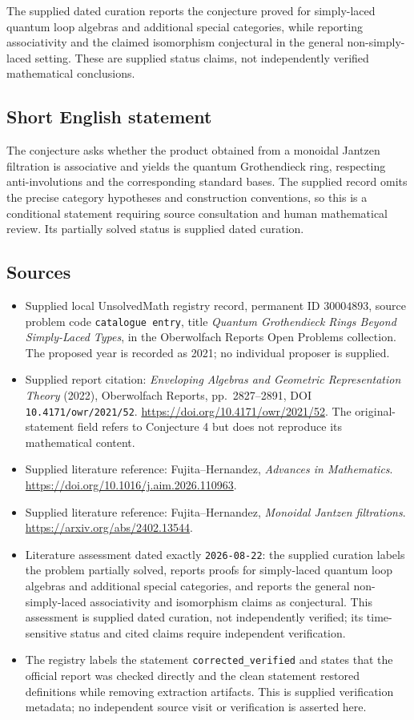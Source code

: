 \documentclass[11pt]{article}
\begin{document}
The supplied dated curation reports the conjecture proved for simply-laced quantum loop algebras and additional special categories, while reporting associativity and the claimed isomorphism conjectural in the general non-simply-laced setting. These are supplied status claims, not independently verified mathematical conclusions.
\subsection{Short English statement}
The conjecture asks whether the product obtained from a monoidal Jantzen filtration is associative and yields the quantum Grothendieck ring, respecting anti-involutions and the corresponding standard bases. The supplied record omits the precise category hypotheses and construction conventions, so this is a conditional statement requiring source consultation and human mathematical review. Its partially solved status is supplied dated curation.
\subsection{Sources}
\begin{itemize}
\item Supplied local UnsolvedMath registry record, permanent ID \(30004893\), source problem code \texttt{catalogue entry}, title \emph{Quantum Grothendieck Rings Beyond Simply-Laced Types}, in the Oberwolfach Reports Open Problems collection. The proposed year is recorded as 2021; no individual proposer is supplied.
\item Supplied report citation: \emph{Enveloping Algebras and Geometric Representation Theory} (2022), Oberwolfach Reports, pp.\ 2827--2891, DOI \texttt{10.4171/owr/2021/52}. \url{https://doi.org/10.4171/owr/2021/52}. The original-statement field refers to Conjecture 4 but does not reproduce its mathematical content.
\item Supplied literature reference: Fujita--Hernandez, \emph{Advances in Mathematics}. \url{https://doi.org/10.1016/j.aim.2026.110963}.
\item Supplied literature reference: Fujita--Hernandez, \emph{Monoidal Jantzen filtrations}. \url{https://arxiv.org/abs/2402.13544}.
\item Literature assessment dated exactly \texttt{2026-08-22}: the supplied curation labels the problem partially solved, reports proofs for simply-laced quantum loop algebras and additional special categories, and reports the general non-simply-laced associativity and isomorphism claims as conjectural. This assessment is supplied dated curation, not independently verified; its time-sensitive status and cited claims require independent verification.
\item The registry labels the statement \texttt{corrected\_verified} and states that the official report was checked directly and the clean statement restored definitions while removing extraction artifacts. This is supplied verification metadata; no independent source visit or verification is asserted here.
\end{itemize}
\end{document}
